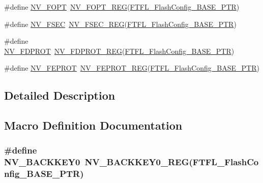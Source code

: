 \begin{DoxyCompactItemize}
\item 
\#define \hyperlink{group___n_v___register___accessor___macros_gad508c386413905d31c12a2319fa355e3}{N\+V\+\_\+\+F\+O\+PT}~\hyperlink{group___n_v___register___accessor___macros_ga66cb061090c7bd7c8b2447b133a93ce5}{N\+V\+\_\+\+F\+O\+P\+T\+\_\+\+R\+EG}(\hyperlink{group___n_v___peripheral_gad199a235b90fe3e6afb977f2d6a9c565}{F\+T\+F\+L\+\_\+\+Flash\+Config\+\_\+\+B\+A\+S\+E\+\_\+\+P\+TR})
\item 
\#define \hyperlink{group___n_v___register___accessor___macros_ga6bdca22aa1e76ebd389ecf4a5d70b93c}{N\+V\+\_\+\+F\+S\+EC}~\hyperlink{group___n_v___register___accessor___macros_gafcfd540f11abf7f4644b7c5a5bc272fe}{N\+V\+\_\+\+F\+S\+E\+C\+\_\+\+R\+EG}(\hyperlink{group___n_v___peripheral_gad199a235b90fe3e6afb977f2d6a9c565}{F\+T\+F\+L\+\_\+\+Flash\+Config\+\_\+\+B\+A\+S\+E\+\_\+\+P\+TR})
\item 
\#define \hyperlink{group___n_v___register___accessor___macros_gaa36202cc8cc9caa02eee166ffce5efc6}{N\+V\+\_\+\+F\+D\+P\+R\+OT}~\hyperlink{group___n_v___register___accessor___macros_ga8c387944c38c4df1397982458df8a2f1}{N\+V\+\_\+\+F\+D\+P\+R\+O\+T\+\_\+\+R\+EG}(\hyperlink{group___n_v___peripheral_gad199a235b90fe3e6afb977f2d6a9c565}{F\+T\+F\+L\+\_\+\+Flash\+Config\+\_\+\+B\+A\+S\+E\+\_\+\+P\+TR})
\item 
\#define \hyperlink{group___n_v___register___accessor___macros_ga042021b7c9ba543352055825ab37f11b}{N\+V\+\_\+\+F\+E\+P\+R\+OT}~\hyperlink{group___n_v___register___accessor___macros_ga689f6db632fecfda17b3a0af63529b29}{N\+V\+\_\+\+F\+E\+P\+R\+O\+T\+\_\+\+R\+EG}(\hyperlink{group___n_v___peripheral_gad199a235b90fe3e6afb977f2d6a9c565}{F\+T\+F\+L\+\_\+\+Flash\+Config\+\_\+\+B\+A\+S\+E\+\_\+\+P\+TR})
\end{DoxyCompactItemize}


\subsection{Detailed Description}


\subsection{Macro Definition Documentation}
\subsubsection[{\texorpdfstring{N\+V\+\_\+\+B\+A\+C\+K\+K\+E\+Y0}{NV_BACKKEY0}}]{\setlength{\rightskip}{0pt plus 5cm}\#define N\+V\+\_\+\+B\+A\+C\+K\+K\+E\+Y0~{\bf N\+V\+\_\+\+B\+A\+C\+K\+K\+E\+Y0\+\_\+\+R\+EG}({\bf F\+T\+F\+L\+\_\+\+Flash\+Config\+\_\+\+B\+A\+S\+E\+\_\+\+P\+TR})}\hypertarget{group___n_v___register___accessor___macros_gadb8e2eb4db4de2a485b31c2a1dd393af}{}\label{group___n_v___register___accessor___macros_gadb8e2eb4db4de2a485b31c2a1dd393af}


